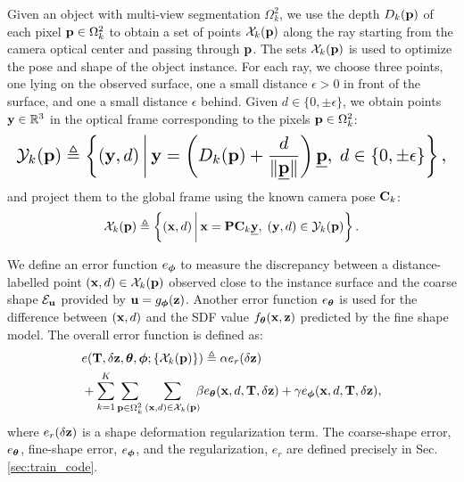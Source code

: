 Given an object with multi-view segmentation $\Omega_{k}^2$, we use the depth $D_k(\mathbf{p})$ of each pixel $\mathbf{p} \in \Omega_{k}^2$ to obtain a set of points ${\cal X}_k(\mathbf{p})$ along the ray starting from the camera optical center and passing through $\mathbf{p}$. The sets ${\cal X}_k(\mathbf{p})$ is used to optimize the pose and shape of the object instance. For each ray, we choose three points, one lying on the observed surface, one a small distance $\epsilon>0$ in front of the surface, and one a small distance $\epsilon$ behind. Given $d \in \{0,\pm \epsilon\}$, we obtain points $\mathbf{y} \in \mathbb{R}^3$ in the optical frame corresponding to the pixels $\mathbf{p} \in \Omega_{k}^2$:
%
\begin{equation*}
\scaleMathLine{\calY_k(\bfp) \triangleq \crl{(\bfy, d) \,\bigg\vert\, \bfy = \prl{D_k(\bfp) + \frac{d}{\|\underline{\bfp}\|}}\underline{\bfp}, \; d \in \{0,\pm \epsilon\}},}
\end{equation*}
%
and project them to the global frame using the known camera pose $\mathbf{C}_k$:
%
\begin{equation}\label{eq:distance_measurements}
{\cal X}_k(\mathbf{p}) \triangleq \left\{(\mathbf{x}, d) \,\bigg\vert\, \mathbf{x} = \mathbf{P} \mathbf{C}_k \underline{\mathbf{y}}, \; (\mathbf{y},d) \in {\cal Y}_k(\mathbf{p})\right\}.
\end{equation}
%

We define an error function $e_{\boldsymbol{\phi}}$ to measure the discrepancy between a distance-labelled point $(\mathbf{x},d) \in {\cal X}_{k}(\mathbf{p})$ observed close to the instance surface and the coarse shape ${\cal E}_{\mathbf{u}}$ provided by $\mathbf{u} = g_{\boldsymbol{\phi}}(\mathbf{z})$. Another error function $e_{\boldsymbol{\theta}}$ is used for the difference between $(\mathbf{x},d)$ and the SDF value $f_{\boldsymbol{\theta}}(\mathbf{x}, \mathbf{z})$ predicted by the fine shape model. The overall error function is defined as: 
\begin{align}
\label{eq:cost_function}
&e(\mathbf{T},\delta \mathbf{z}, \boldsymbol{\theta}, \boldsymbol{\phi} ; \left\{{\cal X}_k(\mathbf{p})\right\}) \triangleq \alpha e_r(\delta \mathbf{z}) \\
&+ \sum_{k=1}^K 
      \sum_{\mathbf{p} \in \Omega_{k}^2}
      \sum_{(\mathbf{x},d) \in {\cal X}_k(\mathbf{p})} \!\!\!\beta e_{\boldsymbol{\theta}}(\mathbf{x},d,\mathbf{T},\delta \mathbf{z}) + \gamma  e_{\boldsymbol{\phi}}(\mathbf{x},d,\mathbf{T},\delta \mathbf{z})\notag,
\end{align}
where $e_r(\delta \mathbf{z})$ is a shape deformation regularization term. The coarse-shape error, $e_{\boldsymbol{\theta}}$, fine-shape error, $e_{\boldsymbol{\phi}}$, and the regularization, $e_r$ are defined precisely in Sec. \ref{sec:train_code}.


